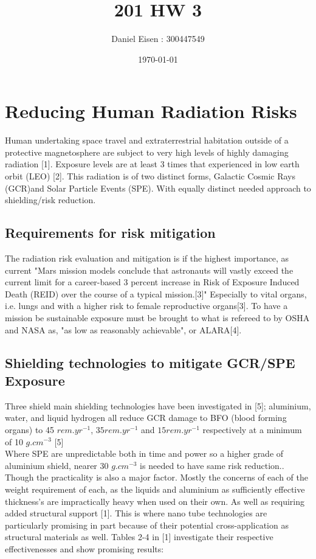 \documentclass[12pt,a4paper]{article}
\title{201 HW 3}
\author{Daniel Eisen : 300447549}
\date{\today}
\begin{document}
\maketitle

\section{Reducing Human Radiation Risks}
Human undertaking space travel and extraterrestrial habitation outside of a protective magnetosphere are subject to very high levels of highly damaging radiation [1]. Exposure levels are at least 3 times that experienced in low earth orbit (LEO) [2]. This radiation is of two distinct forms, Galactic Cosmic Rays (GCR)and Solar Particle Events (SPE). With equally distinct needed approach to shielding/risk reduction.
 
\subsection{Requirements for risk mitigation }
The radiation risk evaluation and mitigation is if the highest importance, as current "Mars mission models conclude that astronauts will vastly exceed the current limit for a career-based 3 percent increase in Risk of Exposure Induced Death (REID) over the course of a typical mission.[3]" Especially to vital organs, i.e. lungs and with a higher risk to female reproductive organs[3]. To have a mission be sustainable exposure must be brought to what is refereed to by OSHA and NASA as, "as low as reasonably achievable", or
ALARA[4].

\subsection{Shielding technologies to mitigate GCR/SPE Exposure}
Three shield main shielding technologies have been investigated in [5]; aluminium, water, and liquid hydrogen all reduce GCR damage to BFO (blood forming organs) to 45 $rem.yr^{-1}$, $35 rem.yr^{-1}$ and $15 rem.yr^{-1}$ respectively at a minimum of 10 $g.cm^{-3}$ [5] \\ Where SPE are unpredictable both in time and power so a higher grade of aluminium shield, nearer 30 $g.cm^{-3}$ is needed to have same risk reduction.. Though the practicality is also a major factor. Mostly the concerns of each of the weight requirement of each, as the liquids and aluminium as sufficiently effective thickness's are impractically heavy when used on their own. As well as requiring added structural support [1].
This is where nano tube technologies are particularly promising in part because of
their potential cross-application as structural materials as well. 
Tables 2-4 in [1] investigate their respective effectivenesses and show promising results:
\end{document}
